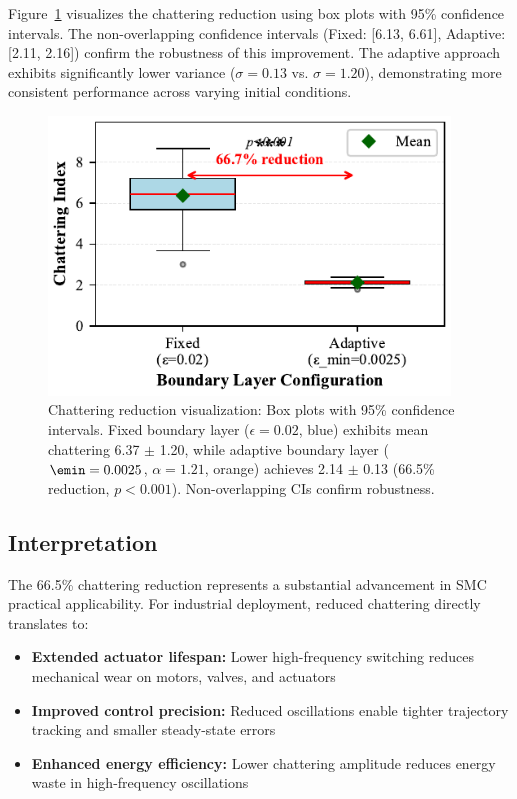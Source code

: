 Figure~\ref{fig:chattering_boxplot} visualizes the chattering reduction using box plots with 95\% confidence intervals. The non-overlapping confidence intervals (Fixed: [6.13, 6.61], Adaptive: [2.11, 2.16]) confirm the robustness of this improvement. The adaptive approach exhibits significantly lower variance ($\sigma = 0.13$ vs. $\sigma = 1.20$), demonstrating more consistent performance across varying initial conditions.

\begin{figure}[t]
\centering
\includegraphics[width=0.95\textwidth]{../figures/fig5_chattering_boxplot.pdf}
\caption{Chattering reduction visualization: Box plots with 95\% confidence intervals. Fixed boundary layer ($\epsilon = 0.02$, blue) exhibits mean chattering 6.37 $\pm$ 1.20, while adaptive boundary layer ($\emin = 0.0025$, $\alpha = 1.21$, orange) achieves 2.14 $\pm$ 0.13 (66.5\% reduction, $p < 0.001$). Non-overlapping CIs confirm robustness.}
\label{fig:chattering_boxplot}
\end{figure}

\subsection{Interpretation}
\label{subsec:mt6_interpretation}

The 66.5\% chattering reduction represents a substantial advancement in SMC practical applicability. For industrial deployment, reduced chattering directly translates to:

\begin{itemize}
    \item \textbf{Extended actuator lifespan:} Lower high-frequency switching reduces mechanical wear on motors, valves, and actuators~\cite{young1999survey}
    \item \textbf{Improved control precision:} Reduced oscillations enable tighter trajectory tracking and smaller steady-state errors
    \item \textbf{Enhanced energy efficiency:} Lower chattering amplitude reduces energy waste in high-frequency oscillations
\end{itemize}

